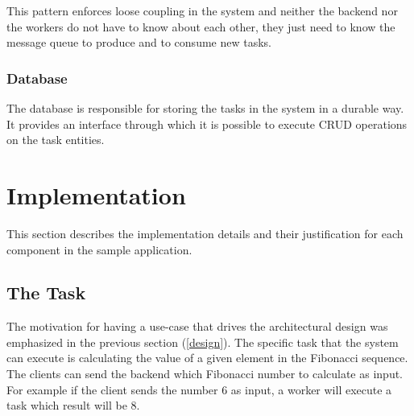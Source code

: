 This pattern enforces loose coupling in the system and neither the backend nor the workers do not have to know about each other, they just need to know the message queue to produce and to consume new tasks. 

\subsubsection{Database}


The database is responsible for storing the tasks in the system in a durable way. It provides an interface through which it is possible to execute CRUD operations on the task entities.

\section{Implementation}

This section describes the implementation details and their justification for each component in the sample application.


\subsection{The Task}

The motivation for having a use-case that drives the architectural design was emphasized in the previous section (\ref{design}). The specific task that the system can execute is calculating the value of a given element in the Fibonacci sequence. The clients can send the backend which Fibonacci number to calculate as input. For example if the client sends the number 6 as input, a worker will execute a task which result will be 8.

